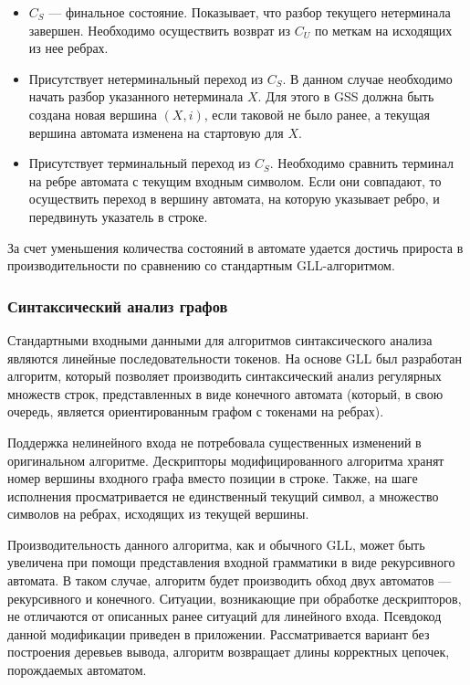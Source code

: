 \begin{itemize}
	\item $C_S$ --- финальное состояние. Показывает, что разбор текущего нетерминала завершен. Необходимо осуществить возврат из $C_U$ по меткам на исходящих из нее ребрах.
	\item Присутствует нетерминальный переход из $C_S$. В данном случае необходимо начать разбор указанного нетерминала $X$. Для этого в GSS должна быть создана новая вершина $(X, i)$, если таковой не было ранее, а текущая вершина автомата изменена на стартовую для $X$.
	\item Присутствует терминальный переход из $C_S$. Необходимо сравнить терминал на ребре автомата с текущим входным символом. Если они совпадают, то осуществить переход в вершину автомата, на которую указывает ребро, и передвинуть указатель в строке.
\end{itemize}

За счет уменьшения количества состояний в автомате удается достичь прироста в производительности по сравнению со стандартным GLL-алгоритмом.

\subsubsection{Синтаксический анализ графов}

Стандартными входными данными для алгоритмов синтаксического анализа являются линейные последовательности токенов. На основе GLL был разработан алгоритм, который позволяет производить синтаксический анализ регулярных множеств строк, представленных в виде конечного автомата (который, в свою очередь, является ориентированным графом с токенами на ребрах).

Поддержка нелинейного входа не потребовала существенных изменений в оригинальном алгоритме. Дескрипторы модифицированного алгоритма хранят номер вершины входного графа вместо позиции в строке. Также, на шаге исполнения просматривается не единственный текущий символ, а множество символов на ребрах, исходящих из текущей вершины.

Производительность данного алгоритма, как и обычного GLL, может быть увеличена при помощи представления входной грамматики в виде рекурсивного автомата. В таком случае, алгоритм будет производить обход двух автоматов --- рекурсивного и конечного. Ситуации, возникающие при обработке дескрипторов, не отличаются от описанных ранее ситуаций для линейного входа. Псевдокод данной модификации приведен в приложении. Рассматривается вариант без построения деревьев вывода, алгоритм возвращает длины корректных цепочек, порождаемых автоматом. 

